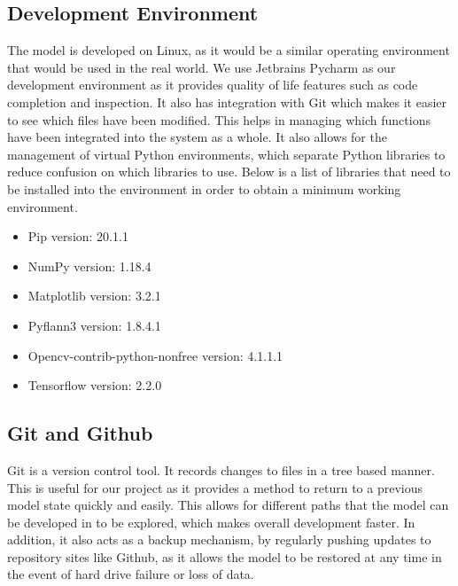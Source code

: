 \subsection{Development Environment}
The model is developed on Linux, as it would be a similar operating environment that would be used in the real world.
We use Jetbrains Pycharm as our development environment as it provides quality of life features such as code completion and inspection. 
It also has integration with Git which makes it easier to see which files have been modified.
This helps in managing which functions have been integrated into the system as a whole.
It also allows for the management of virtual Python environments, which separate Python libraries to reduce confusion on which libraries to use. 
Below is a list of libraries that need to be installed into the environment in order to obtain a minimum working environment.

\begin{itemize}
    \item Pip version: 20.1.1
    \item NumPy version: 1.18.4
    \item Matplotlib version: 3.2.1
    \item Pyflann3 version: 1.8.4.1
    \item Opencv-contrib-python-nonfree version: 4.1.1.1
    \item Tensorflow version: 2.2.0
\end{itemize}

\subsection{Git and Github}
Git is a version control tool.
It records changes to files in a tree based manner.
This is useful for our project as it provides a method to return to a previous model state quickly and easily.
This allows for different paths that the model can be developed in to be explored, which makes overall development faster.
In addition, it also acts as a backup mechanism, by regularly pushing updates to repository sites like Github, as it allows the model to be restored at any time in the event of hard drive failure or loss of data.


